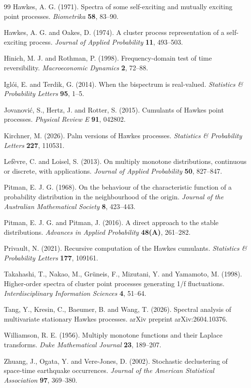 \documentclass[aap,press]{apt} \volno{00} \partno{00}
\newcommand{\1}{\mathbf{1}}
\numberwithin{equation}{section}
\begin{document}
{\begin{thebibliography}{99}
Hawkes, A. G. (1971).
Spectra of some self-exciting and mutually exciting point processes.
\emph{Biometrika} \textbf{58}, 83--90.

Hawkes, A. G. and Oakes, D. (1974).
A cluster process representation of a self-exciting process.
\emph{Journal of Applied Probability} \textbf{11}, 493--503.

Hinich, M. J. and Rothman, P. (1998).
Frequency-domain test of time reversibility.
\emph{Macroeconomic Dynamics} \textbf{2}, 72--88.

Igl{\'o}i, E. and Terdik, G. (2014).
When the bispectrum is real-valued.
\emph{Statistics \& Probability Letters} \textbf{95}, 1--5.

Jovanovi{\'c}, S., Hertz, J. and Rotter, S. (2015).
Cumulants of {H}awkes point processes.
\emph{Physical Review E} \textbf{91}, 042802.

Kirchner, M. (2026).
Palm versions of Hawkes processes.
\emph{Statistics \& Probability Letters} \textbf{227}, 110531.

Lef{\`e}vre, C. and Loisel, S. (2013).
On multiply monotone distributions, continuous or discrete, with applications.
\emph{Journal of Applied Probability} \textbf{50}, 827--847.

Pitman, E. J. G. (1968).
On the behaviour of the characteristic function of a probability distribution in the neighbourhood of the origin.
\emph{Journal of the Australian Mathematical Society} \textbf{8}, 423--443.

Pitman, E. J. G. and Pitman, J. (2016).
A direct approach to the stable distributions.
\emph{Advances in Applied Probability} \textbf{48(A)}, 261--282.

Privault, N. (2021).
Recursive computation of the Hawkes cumulants.
\emph{Statistics \& Probability Letters} \textbf{177}, 109161.

Takahashi, T., Nakao, M., Gr{\"u}neis, F., Mizutani, Y. and Yamamoto, M. (1998).
Higher-order spectra of cluster point processes generating 1/f fluctuations.
\emph{Interdisciplinary Information Sciences} \textbf{4}, 51--64.

Tang, Y., Kresin, C., Baeumer, B. and Wang, T. (2026).
Spectral analysis of multivariate stationary Hawkes processes.
arXiv preprint arXiv:2604.10376.


Williamson, R. E. (1956).
Multiply monotone functions and their Laplace transforms.
\emph{Duke Mathematical Journal} \textbf{23}, 189--207.

Zhuang, J., Ogata, Y. and Vere-Jones, D. (2002).
Stochastic declustering of space-time earthquake occurrences.
\emph{Journal of the American Statistical Association} \textbf{97}, 369--380.

\end{thebibliography}

}
\end{document}
